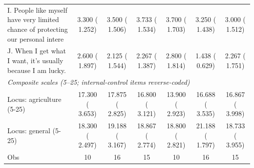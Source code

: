 \begin{tabular}{lcccccc}
I. People like myself have very limited chance of protecting our personal intere &     3.300 (    1.252) &     3.500 (    1.506) &     3.733 (    1.534)\sym{*} &     3.700 (    1.703) &     3.250 (    1.438) &     3.000 (    1.512) \\
J. When I get what I want, it’s usually because I am lucky. &     2.600 (    1.897) &     2.125 (    1.544) &     2.267 (    1.387) &     2.800 (    1.814) &     1.438 (    0.629)\sym{***} &     2.267 (    1.751) \\
\multicolumn{7}{l}{\textit{Composite scales (5--25; internal-control items reverse-coded)}}\\
Locus: agriculture (5-25) &    17.300 (    3.653) &    17.875 (    2.825) &    16.800 (    3.121) &    13.900 (    2.923) &    16.688 (    3.535) &    16.867 (    3.998)\sym{**} \\
Locus: general (5-25) &    18.300 (    2.497) &    19.188 (    3.167) &    18.867 (    2.774) &    18.800 (    2.821) &    21.188 (    1.797)\sym{***} &    18.733 (    3.955) \\
\midrule
Obs &        10 &        16 &        15 &        10 &        16 &        15 \\
\bottomrule
\end{tabular}
